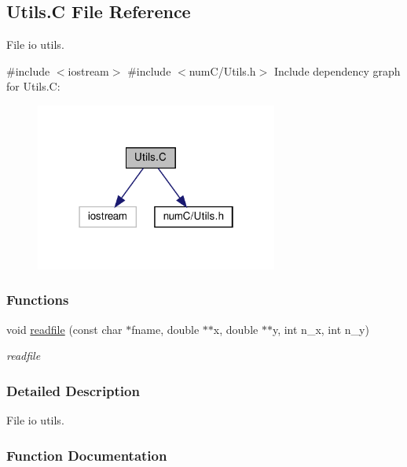 \hypertarget{Utils_8C}{}\subsection{Utils.\+C File Reference}
\label{Utils_8C}


File io utils.  


{\ttfamily \#include $<$iostream$>$}\newline
{\ttfamily \#include $<$num\+C/\+Utils.\+h$>$}\newline
Include dependency graph for Utils.\+C\+:\nopagebreak
\begin{figure}[H]
\begin{center}
\leavevmode
\includegraphics[width=226pt]{Utils_8C__incl}
\end{center}
\end{figure}
\subsubsection*{Functions}
\begin{DoxyCompactItemize}
\item 
void \hyperlink{Utils_8C_a3afdc4cf2cc3f040459fbd195e330f36}{readfile} (const char $\ast$fname, double $\ast$$\ast$x, double $\ast$$\ast$y, int n\+\_\+x, int n\+\_\+y)
\begin{DoxyCompactList}\small\item\em readfile \end{DoxyCompactList}\end{DoxyCompactItemize}


\subsubsection{Detailed Description}
File io utils. 



\subsubsection{Function Documentation}
\mbox{\label{Utils_8C_a3afdc4cf2cc3f040459fbd195e330f36}} 
